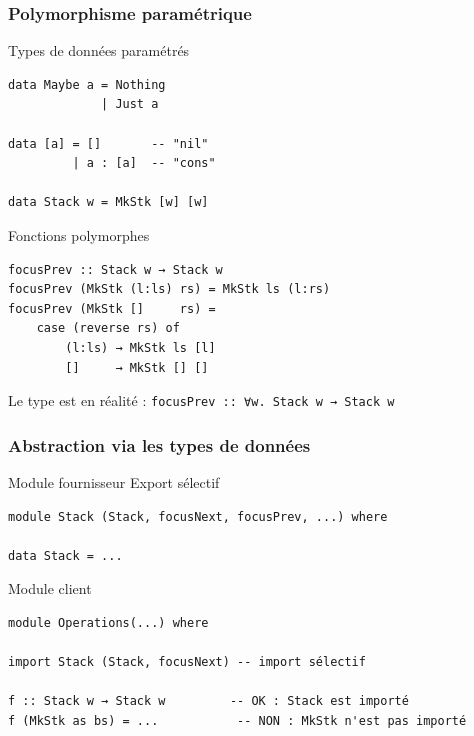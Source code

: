 \documentclass[10pt]{beamer}
\begin{document}
\begin{frame}[fragile]
\frametitle{Polymorphisme paramétrique}
\begin{block}
{Types de données paramétrés}
\begin{verbatim}
data Maybe a = Nothing
             | Just a

data [a] = []       -- "nil"
         | a : [a]  -- "cons"

data Stack w = MkStk [w] [w]
\end{verbatim}
\end{block}
\pause
\begin{block}
{Fonctions polymorphes}
\begin{verbatim}
focusPrev :: Stack w → Stack w
focusPrev (MkStk (l:ls) rs) = MkStk ls (l:rs)
focusPrev (MkStk []     rs) =
    case (reverse rs) of
        (l:ls) → MkStk ls [l]
        []     → MkStk [] []
\end{verbatim}
\end{block}
Le type est en réalité : \verb|focusPrev :: ∀w. Stack w → Stack w|
\end{frame}



\begin{frame}[fragile]
\frametitle{Abstraction via les types de données}
\begin{block}
{Module fournisseur}
Export sélectif
\begin{verbatim}
module Stack (Stack, focusNext, focusPrev, ...) where

data Stack = ...
\end{verbatim}
\end{block}
\begin{block}
{Module client}
\begin{verbatim}
module Operations(...) where

import Stack (Stack, focusNext) -- import sélectif

f :: Stack w → Stack w         -- OK : Stack est importé
f (MkStk as bs) = ...           -- NON : MkStk n'est pas importé
\end{verbatim}
\end{block}
\end{frame}
\end{document}
